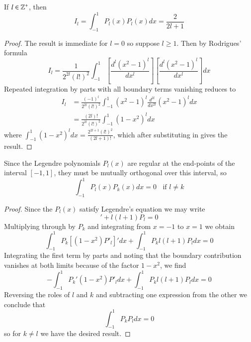 \documentclass[12pt, a4paper, oneside, openright, titlepage]{book}
\begin{document}
\begin{prop}
    If $l \in \mathbb Z^+$, then \begin{equation*}
        I_l = \int_{-1}^1P_l(x)P_l(x)dx = \frac{2}{2l+1}
    \end{equation*}
\end{prop}
\begin{proof}
    The result is immediate for $l= 0$ so suppose $l \geq 1$. Then by Rodrigues' formula\begin{equation*}
        I_l = \frac{1}{2^{2l}(l!)^2}\int_{-1}^1\left[\frac{d^l(x^2-1)^l}{dx^l}\right]\left[\frac{d^l(x^2-1)^l}{dx^l}\right]dx 
    \end{equation*}
    Repeated integration by parts with all boundary terms vanishing reduces to \begin{align*}
        I_l &= \frac{(-1)^l}{2^{2l}(l!)^2}\int_{-1}^1(x^2-1)^l\frac{d^{2l}}{dx^{2l}}(x^2-1)^ldx \\
        &= \frac{(2l)!}{2^{2l}(l!)^2}\int_{-1}^1(1-x^2)^ldx 
    \end{align*}
    where $\int_{-1}^1(1-x^2)^ldx = \frac{2^{2l+1}(l!)^2}{(2l+1)!}$, which after substituting in gives the result.
\end{proof}

\begin{prop}
    Since the Legendre polynomials $P_l(x)$ are regular at the end-points of the interval $[-1,1]$, they must be mutually orthogonal over this interval, so \begin{equation*}
        \int_{-1}^1P_l(x)P_k(x)dx = 0\;\;\text{ if }l\neq k
    \end{equation*}
\end{prop}
\begin{proof}
    Since the $P_l(x)$ satisfy Legendre's equation we may write \begin{equation*}
        [(1-x^2)P_l']' + l(l+1)P_l = 0
    \end{equation*}
    Multiplying through by $P_k$ and integrating from $x=-1$ to $x=1$ we obtain \begin{equation*}
        \int_{-1}^1P_k[(1-x^2)P'_l]'dx + \int_{-1}^1P_kl(l+1)P_ldx = 0
    \end{equation*}
    Integrating the first term by parts and noting that the boundary contribution vanishes at both limits because of the factor $1-x^2$, we find \begin{equation*}
        -\int_{-1}^1P_k'(1-x^2)P'_ldx + \int_{-1}^1P_kl(l+1)P_ldx = 0
    \end{equation*}
    Reversing the roles of $l$ and $k$ and subtracting one expression from the other we conclude that \begin{equation*}
        [k(k+1)-l(l+1)]\int_{-1}^1P_kP_ldx = 0
    \end{equation*}
    so for $k \neq l$ we have the desired result.
\end{proof}
\end{document}
